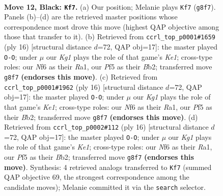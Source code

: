 \documentclass[11pt]{article}
\begin{document}
\clearpage

\begin{figure}[p]\centering
\begin{subfigure}{0.46\textwidth}\centering
\resizebox{\linewidth}{!}{%
\newchessgame
\chessboard[
  setfen={rnb2rk1/p3b1pp/1ppq1n2/3p1p2/3P3P/1P2PNP1/P3QPB1/RNB1R1K1 b - - 0 12},
  showmover=false,
  pgfstyle=straightmove, color=movearrow, markmove={g8-f7}
]}
\caption{}
\end{subfigure}\hfill
\begin{subfigure}{0.46\textwidth}\centering
\resizebox{\linewidth}{!}{%
\newchessgame
\chessboard[
  setfen={rnbqrbk1/pp3ppp/2pp1n2/4p3/1PP5/2N1PN2/PBQPBPPP/R3K2R w KQ - 4 9},
  showmover=false,
  pgfstyle=straightmove, color=movearrow, markmove={e1-g1}
]}
\caption{}
\end{subfigure}
\\[4pt]
\begin{subfigure}{0.46\textwidth}\centering
\resizebox{\linewidth}{!}{%
\newchessgame
\chessboard[
  setfen={rnbqrbk1/pp3ppp/2pp1n2/4p3/1PP5/2N1PN2/PBQPBPPP/R3K2R w KQ - 2 9},
  showmover=false,
  pgfstyle=straightmove, color=movearrow, markmove={e1-g1}
]}
\caption{}
\end{subfigure}\hfill
\begin{subfigure}{0.46\textwidth}\centering
\resizebox{\linewidth}{!}{%
\newchessgame
\chessboard[
  setfen={rnbqrbk1/pp3ppp/2pp1n2/4p3/1PP5/2N1PN2/PBQPBPPP/R3K2R w KQ - 7 9},
  showmover=false,
  pgfstyle=straightmove, color=movearrow, markmove={e1-g1}
]}
\caption{}
\end{subfigure}
\caption{\textbf{Move 12, Black: \texttt{Kf7}.} (a) Our position; Melanie plays \texttt{Kf7} (\texttt{g8f7}). Panels (b)--(d) are the retrieved master positions whose correspondence most drove this move (highest QAP objective among those that transfer to it). (b) Retrieved from \texttt{ccrl\_top\_p0001\#1659} (ply 16) [structural distance $d$=72, QAP obj=17]: the master played \texttt{O-O}; under $\mu$ our \emph{Kg1} plays the role of that game's \emph{Ke1}; cross-type roles: our \emph{N}f6 as their \emph{R}a1, our \emph{P}f5 as their \emph{B}b2; transferred move \texttt{g8f7} \textbf{(endorses this move)}. (c) Retrieved from \texttt{ccrl\_top\_p0001\#1962} (ply 16) [structural distance $d$=72, QAP obj=17]: the master played \texttt{O-O}; under $\mu$ our \emph{Kg1} plays the role of that game's \emph{Ke1}; cross-type roles: our \emph{N}f6 as their \emph{R}a1, our \emph{P}f5 as their \emph{B}b2; transferred move \texttt{g8f7} \textbf{(endorses this move)}. (d) Retrieved from \texttt{ccrl\_top\_p0002\#112} (ply 16) [structural distance $d$=72, QAP obj=17]: the master played \texttt{O-O}; under $\mu$ our \emph{Kg1} plays the role of that game's \emph{Ke1}; cross-type roles: our \emph{N}f6 as their \emph{R}a1, our \emph{P}f5 as their \emph{B}b2; transferred move \texttt{g8f7} \textbf{(endorses this move)}. Synthesis: 4 retrieved analogs transferred to \texttt{Kf7} (summed QAP objective 69, the strongest correspondence among the candidate moves); Melanie committed it via the \texttt{search} selector.}
\label{fig:thought-m23}
\end{figure}
\end{document}
